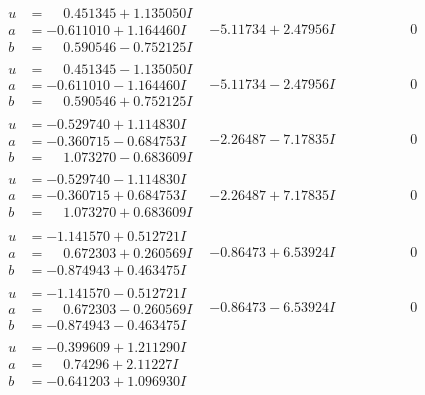 \documentclass[1p]{elsarticle_modified}
\theoremstyle{definition}
\begin{document}
$$\begin{array}{c|c|c}
 \hline 
\begin{aligned}
u &= \phantom{-}0.451345 + 1.135050 I \\
a &= -0.611010 + 1.164460 I \\
b &= \phantom{-}0.590546 - 0.752125 I\end{aligned}
 & -5.11734 + 2.47956 I & \phantom{-0.000000 } 0 \\ \hline\begin{aligned}
u &= \phantom{-}0.451345 - 1.135050 I \\
a &= -0.611010 - 1.164460 I \\
b &= \phantom{-}0.590546 + 0.752125 I\end{aligned}
 & -5.11734 - 2.47956 I & \phantom{-0.000000 } 0 \\ \hline\begin{aligned}
u &= -0.529740 + 1.114830 I \\
a &= -0.360715 - 0.684753 I \\
b &= \phantom{-}1.073270 - 0.683609 I\end{aligned}
 & -2.26487 - 7.17835 I & \phantom{-0.000000 } 0 \\ \hline\begin{aligned}
u &= -0.529740 - 1.114830 I \\
a &= -0.360715 + 0.684753 I \\
b &= \phantom{-}1.073270 + 0.683609 I\end{aligned}
 & -2.26487 + 7.17835 I & \phantom{-0.000000 } 0 \\ \hline\begin{aligned}
u &= -1.141570 + 0.512721 I \\
a &= \phantom{-}0.672303 + 0.260569 I \\
b &= -0.874943 + 0.463475 I\end{aligned}
 & -0.86473 + 6.53924 I & \phantom{-0.000000 } 0 \\ \hline\begin{aligned}
u &= -1.141570 - 0.512721 I \\
a &= \phantom{-}0.672303 - 0.260569 I \\
b &= -0.874943 - 0.463475 I\end{aligned}
 & -0.86473 - 6.53924 I & \phantom{-0.000000 } 0 \\ \hline\begin{aligned}
u &= -0.399609 + 1.211290 I \\
a &= \phantom{-}0.74296 + 2.11227 I \\
b &= -0.641203 + 1.096930 I\end{aligned}

\end{array}$$
\end{document}
